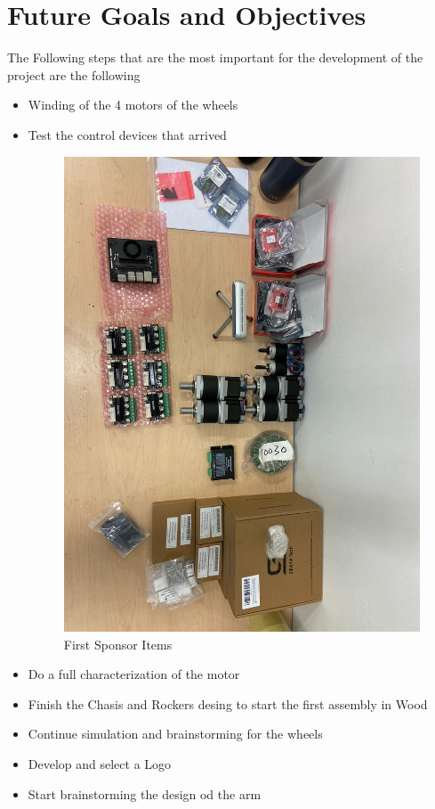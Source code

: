 \documentclass{article}
\begin{document}
\section{Future Goals and Objectives}
The Following steps that are the most important for the development of the project are the following
\begin{itemize}
    \item Winding of the 4 motors of the wheels
    \item Test the control devices that arrived
    \begin{figure}[H]
        \centering
        \includegraphics[width=\linewidth]{Images/Extra/PrimeraCompra.jpg}
        \caption{First Sponsor Items}
    \end{figure}
    \item Do a full characterization of the motor
    \item Finish the Chasis and Rockers desing to start the first assembly in Wood
    \item Continue simulation and brainstorming for the wheels
    \item Develop and select a Logo
    \item Start brainstorming the design od the arm
\end{itemize}
\end{document}
